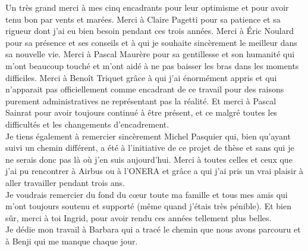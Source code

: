 \documentclass[main.tex]{subfiles}
\begin{document}
Un très grand merci à mes cinq encadrants pour leur optimisme et pour avoir tenu
bon par vents et marées. Merci à Claire Pagetti pour sa patience et sa rigueur
dont j'ai eu bien besoin pendant ces trois années. Merci à Éric Noulard pour sa
présence et ses conseils et à qui je souhaite sincèrement le meilleur dans sa
nouvelle vie. Merci à Pascal Maurère pour sa gentillesse et son humanité qui
m'ont beaucoup touché et m'ont aidé à ne pas baisser les bras dans les moments
difficiles. Merci à Benoît Triquet grâce à qui j'ai énormément appris et qui
n'apparait pas officiellement comme encadrant de ce travail pour des raisons
purement administratives ne représentant pas la réalité. Et merci à Pascal
Sainrat pour avoir toujours continué à être présent, et ce malgré toutes les
difficultés et les changements d'encadrement. \\

Je tiens également à remercier sincèrement Michel Pasquier qui, bien qu'ayant
suivi un chemin différent, a été à l'initiative de ce projet de thèse et sans
qui je ne serais donc pas là où j'en suis aujourd'hui. Merci à toutes celles et
ceux que j'ai pu rencontrer à Airbus ou à l'ONERA et grâce a qui j'ai pris un
vrai plaisir à aller travailler pendant trois ans. \\

Je voudrais remercier du fond du cœur toute ma famille et tous mes amis qui
m'ont toujours soutenu et supporté (même quand j'étais très pénible). Et bien
sûr, merci à toi Ingrid, pour avoir rendu ces années tellement plus belles.\\

Je dédie mon travail à Barbara qui a tracé le chemin que nous avons parcouru et
à Benji qui me manque chaque jour.

\cleardoublepage
\end{document}
